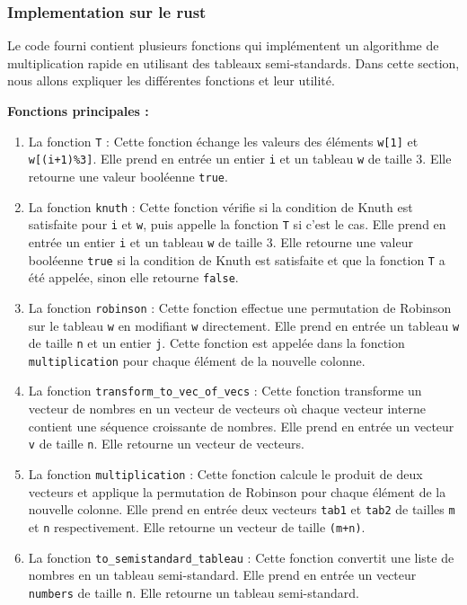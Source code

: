 \subsubsection{Implementation sur le rust}
Le code fourni contient plusieurs fonctions qui implémentent un algorithme de multiplication rapide en utilisant des tableaux semi-standards. Dans cette section, 
nous allons expliquer les différentes fonctions et leur utilité.

\textbf{Fonctions principales :}
\begin{enumerate}
	\item La fonction \verb|T| :
	Cette fonction échange les valeurs des éléments \verb|w[1]| et \verb|w[(i+1)%3]|. Elle prend en entrée un entier \verb|i| et un tableau \verb|w| de taille 3. Elle retourne une valeur booléenne \verb|true|.
	\item La fonction \verb|knuth| :
	Cette fonction vérifie si la condition de Knuth est satisfaite pour \verb|i| et \verb|w|, puis appelle la fonction \verb|T| si c'est le cas. Elle prend en entrée un entier \verb|i| et un tableau \verb|w| de taille 3. Elle retourne une valeur booléenne \verb|true| si la condition de Knuth est satisfaite et que la fonction \verb|T| a été appelée, sinon elle retourne \verb|false|.

	\item La fonction \verb|robinson| :
	Cette fonction effectue une permutation de Robinson sur le tableau \verb|w| en modifiant \verb|w| directement. Elle prend en entrée un tableau \verb|w| de taille \verb|n| et un entier \verb|j|. Cette fonction est appelée dans la fonction \verb|multiplication| pour chaque élément de la nouvelle colonne.

	\item La fonction \verb|transform_to_vec_of_vecs| :
	Cette fonction transforme un vecteur de nombres en un vecteur de vecteurs où chaque vecteur interne contient une séquence croissante de nombres. Elle prend en entrée un vecteur \verb|v| de taille \verb|n|. Elle retourne un vecteur de vecteurs.

	\item La fonction \verb|multiplication| :
	Cette fonction calcule le produit de deux vecteurs et applique la permutation de Robinson pour chaque élément de la nouvelle colonne. Elle prend en entrée deux vecteurs \verb|tab1| et \verb|tab2| de tailles \verb|m| et \verb|n| respectivement. Elle retourne un vecteur de taille \verb|(m+n)|.

	\item La fonction \verb|to_semistandard_tableau| :
	Cette fonction convertit une liste de nombres en un tableau semi-standard. Elle prend en entrée un vecteur \verb|numbers| de taille \verb|n|. Elle retourne un tableau semi-standard.
\end{enumerate}

